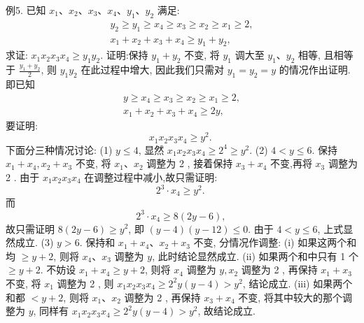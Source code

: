 例5. 已知 $x_1 、 x_2 、 x_3 、 x_4 、 y_1 、 y_2$ 满足:
$$
\begin{gathered}
y_2 \geqslant y_1 \geqslant x_4 \geqslant x_3 \geqslant x_2 \geqslant x_1 \geqslant 2, \\
x_1+x_2+x_3+x_4 \geqslant y_1+y_2,
\end{gathered}
$$
求证: $x_1 x_2 x_3 x_4 \geqslant y_1 y_2$.
证明:保持 $y_1+y_2$ 不变, 将 $y_1$ 调大至 $y_1 、 y_2$ 相等, 且相等于 $\frac{y_1+y_2}{2}$, 则 $y_1 y_2$ 在此过程中增大, 因此我们只需对 $y_1=y_2=y$ 的情况作出证明.
即已知
$$
\begin{gathered}
y \geqslant x_4 \geqslant x_3 \geqslant x_2 \geqslant x_1 \geqslant 2, \\
x_1+x_2+x_3+x_4 \geqslant 2 y,
\end{gathered}
$$
要证明:
$$
x_1 x_2 x_3 x_4 \geqslant y^2 \text {. }
$$
下面分三种情况讨论:
(1) $y \leqslant 4$, 显然 $x_1 x_2 x_3 x_4 \geqslant 2^4 \geqslant y^2$.
(2) $4<y \leqslant 6$. 保持 $x_1+x_4, x_2+x_3$ 不变, 将 $x_1 、 x_2$ 调整为 2 , 接着保持 $x_3+x_4$ 不变,再将 $x_3$ 调整为 2 .
由于 $x_1 x_2 x_3 x_4$ 在调整过程中减小,故只需证明:
$$
2^3 \cdot x_4 \geqslant y^2 \text {. }
$$
而
$$
2^3 \cdot x_4 \geqslant 8(2 y-6) \text {, }
$$
故只需证明 $8(2 y-6) \geqslant y^2$, 即 $(y-4)(y-12) \leqslant 0$.
由于 $4<y \leqslant 6$, 上式显然成立.
(3) $y>6$. 保持和 $x_1+x_4 、 x_2+x_3$ 不变, 分情况作调整:
(i) 如果这两个和均 $\geqslant y+2$, 则将 $x_4 、 x_3$ 调整为 $y$, 此时结论显然成立.
(ii) 如果两个和中只有 1 个 $\geqslant y+2$. 不妨设 $x_1+x_4 \geqslant y+2$, 则将 $x_4$ 调整为 $y, x_2$ 调整为 2 , 再保持 $x_1+x_3$ 不变, 将 $x_1$ 调整为 2 , 则 $x_1 x_2 x_3 x_4 \geqslant 2^2 y(y-4)>y^2$, 结论成立.
(iii) 如果两个和都 $<y+2$, 则将 $x_1 、 x_2$ 调整为 2 , 再保持 $x_3+x_4$ 不变, 将其中较大的那个调整为 $y$, 同样有 $x_1 x_2 x_3 x_4 \geqslant 2^2 y(y-4)>y^2$, 故结论成立.



